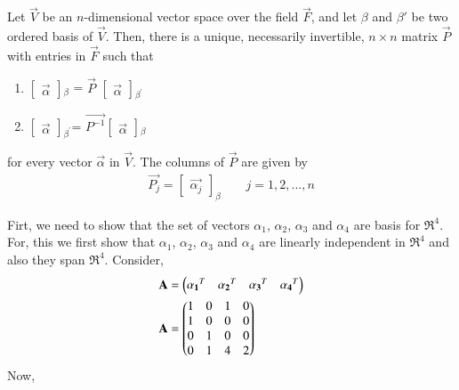 \begin{theorem} \label{eq:solutions/2/4/1/1}
Let $\vec{V}$ be an $n$-dimensional vector space over the field $\vec{F}$, and let $\beta$ and $\beta'$ be two ordered basis of $\vec{V}$. Then, there is a unique, necessarily invertible, $n\times n$ matrix $\vec{P}$ with entries in $\vec{F}$ such that 
\begin{enumerate}
	\item $\begin{bmatrix}
	\vec{\alpha}
	\end{bmatrix}$$_\beta$ = $\vec{P}$  $\begin{bmatrix}
	\vec{\alpha} 
\end{bmatrix}$$_{\beta^{'}}$
    \item $\begin{bmatrix}
    	\vec{\alpha}
    \end{bmatrix}$$_{\beta^{'}}$= $\vec{P^{-1}}$$\begin{bmatrix}
    \vec{\alpha}	
\end{bmatrix}$$_\beta$
\end{enumerate}
for every vector $\vec{\alpha}$ in $\vec{V}$. The columns of $\vec{P}$ are given by
\begin{align}
\vec{P_j} =  \begin{bmatrix}
	\vec{\alpha_j}
\end{bmatrix}_{\beta}	\qquad j = 1,2,...,n
\end{align}
\end{theorem}
Firt, we need to show that the set of vectors $\alpha_1$, $\alpha_2$, $\alpha_3$ and $\alpha_4$ are basis for $\Re^4$. For, this we first show that $\alpha_1$, $\alpha_2$, $\alpha_3$ and $\alpha_4$ are linearly independent in $\Re^4$ and also they span $\Re^4$. Consider,
\begin{align}
& \mathbf{A} = \begin{pmatrix}\mathbf{\alpha_1}^T & \mathbf{\alpha_2}^T & \mathbf{\alpha_3}^T & \mathbf{\alpha_4}^T \end{pmatrix} \\
& \mathbf{A} = \begin{pmatrix}1 & 0 & 1 & 0 \\ 1 & 0 & 0 & 0 \\ 0 & 1 & 0 & 0 \\ 0 & 1 & 4 & 2\end{pmatrix}
\end{align}
Now,
